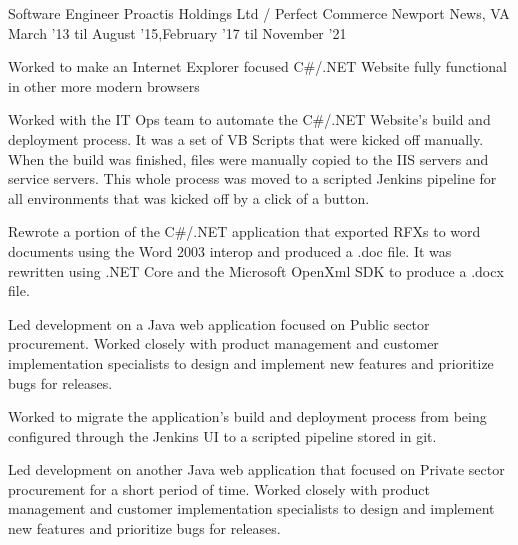 

\begin{cventries}

    \cventry
    {Software Engineer} %
    {Proactis Holdings Ltd / Perfect Commerce} %
    {Newport News, VA} %
    {March '13 til August '15,\newline February '17 til November '21} %
    {
        \begin{cvitems} %
        \item {Worked to make an Internet Explorer focused C\#/.NET Website fully functional in other more modern browsers}
        \item {Worked with the IT Ops team to automate the C\#/.NET Website's build and deployment process. It was a set of VB Scripts that were kicked off manually. When the build was finished, files were manually copied to the IIS servers and service servers. This whole process was moved to a scripted Jenkins pipeline for all environments that was kicked off by a click of a button.}
        \item {Rewrote a portion of the C\#/.NET application that exported RFXs to word documents using the Word 2003 interop and produced a .doc file. It was rewritten using .NET Core and the Microsoft OpenXml SDK to produce a .docx file.}
        \item {Led development on a Java web application focused on Public sector procurement. Worked closely with product management and customer implementation specialists to design and implement new features and prioritize bugs for releases.}
        \item {Worked to migrate the application's build and deployment process from being configured through the Jenkins UI to a scripted pipeline stored in git.}
        \item {Led development on another Java web application that focused on Private sector procurement for a short period of time. Worked closely with product management and customer implementation specialists to design and implement new features and prioritize bugs for releases.}

\end{cvitems}}
\end{cventries}
